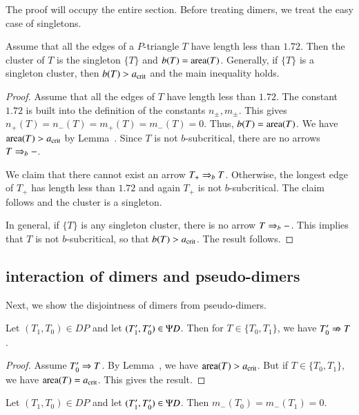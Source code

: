 The proof will occupy the entire section.  Before treating dimers, we
treat the easy case of singletons.

\begin{lemma}  
  Assume that all the edges of a $P$-triangle $T$ have length less
  than $1.72$.  Then the cluster of $T$ is the singleton $\{T\}$ and
  $b(T) ={\operatorname{area}}(T)$.  Generally, if $\{T\}$ is a singleton
  cluster, then $b(T) > a_\text{crit}$ and the main inequality holds.
\end{lemma}

\begin{proof} 
  Assume that all the edges of $T$ have length less than $1.72$.  The
  constant $1.72$ is built into the definition of the constants
  $n_\pm,m_\pm$. This gives $n_+(T)=n_-(T) = m_+(T)=m_-(T)=0$.  Thus,
  $b(T)={\operatorname{area}}(T)$.  We have ${\operatorname{area}}(T) > a_\text{crit}$ by
  Lemma~.  Since $T$ is not $b$-subcritical, there are
  no arrows $T\Rightarrow_{b} -$.

  We claim that there cannot exist an arrow $T_+\Rightarrow_{b} T$.  Otherwise,
  the longest edge of $T_+$ has length less than $1.72$ and again
  $T_+$ is not $b$-subcritical.  The claim follows and the cluster is
  a singleton.

  In general, if $\{T\}$ is any singleton cluster, there is no arrow
  $T\Rightarrow_{b} -$.  This implies that $T$ is not $b$-subcritical, so that
  $b(T) > a_\text{crit}$.  The result follows.
\end{proof}

\subsection{interaction of dimers and pseudo-dimers}

Next, we show the disjointness of dimers from pseudo-dimers.

\begin{lemma}
  Let $(T_1,T_0)\in DP$ and let $(T'_1,T'_0)\in\Psi D$.  Then for
  $T\in\{T_0,T_1\}$, we have $T'_0\nRightarrow T$.
\end{lemma}

\begin{proof} 
  Assume $T'_0\Rightarrow T$.  By Lemma~, we have
  ${\operatorname{area}}(T)>a_\text{crit}$.  But if $T\in\{T_0,T_1\}$, we have
  ${\operatorname{area}}(T)=a_\text{crit}$.  This gives the result.
\end{proof}

\begin{corollary}  
  Let $(T_1,T_0)\in DP$ and let $(T'_1,T'_0)\in \Psi D$.  Then
  $m_-(T_0)=m_-(T_1)=0$.
\end{corollary}

